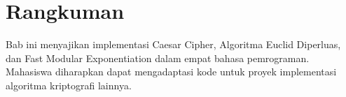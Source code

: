 \section*{Rangkuman}
Bab ini menyajikan implementasi Caesar Cipher, Algoritma Euclid Diperluas, dan Fast Modular Exponentiation dalam empat bahasa pemrograman. Mahasiswa diharapkan dapat mengadaptasi kode untuk proyek implementasi algoritma kriptografi lainnya.
